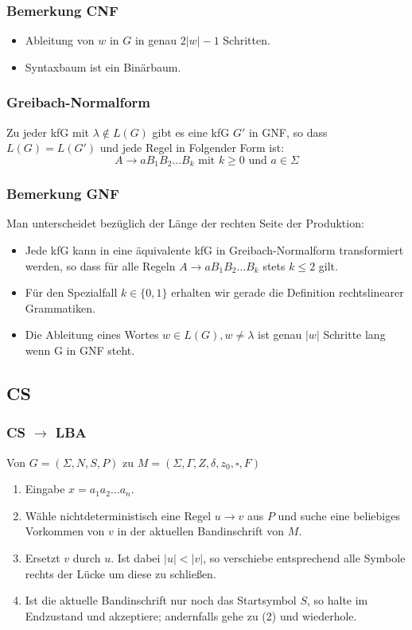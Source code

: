 \documentclass[9pt, a4paper]{article}
\begin{document}
\subsubsection{Bemerkung CNF}
\begin{itemize}
	\item Ableitung von $w$ in $G$ in genau $2|w|-1$ Schritten.
	\item Syntaxbaum ist ein Binärbaum.
\end{itemize}

\subsubsection{Greibach-Normalform}
Zu jeder kfG mit $\lambda \notin L(G)$ gibt es eine kfG $G'$ in GNF, so dass $L(G) = L(G')$ und jede Regel in Folgender Form ist:
$$A \to aB_1B_2 \dots B_k \text{ mit } k \geq 0 \text{ und } a \in \Sigma$$
\subsubsection{Bemerkung GNF}
Man unterscheidet bezüglich der Länge der rechten Seite der Produktion:
\begin{itemize}
	\item Jede kfG kann in eine äquivalente kfG in Greibach-Normalform transformiert werden, so dass für alle Regeln $A \to aB_1B_2 \dots B_k$ stets $k \leq 2$ gilt.
	\item Für den Spezialfall $k \in \{0, 1\}$ erhalten wir gerade die Definition rechtslinearer Grammatiken.
	\item Die Ableitung eines Wortes $w \in L(G), w \neq \lambda$ ist genau $|w|$ Schritte lang wenn G in GNF steht.
\end{itemize}

\subsection{CS}
\subsubsection{CS $\to$ LBA}
Von $G = (\Sigma, N, S, P)$ zu $M = (\Sigma, \Gamma, Z, \delta, z_0, \square, F)$
\begin{enumerate}
	\item Eingabe $x = a_1a_2 \dots a_n$.
	\item Wähle nichtdeterministisch eine Regel $u \to v$ aus $P$ und suche eine beliebiges Vorkommen von $v$ in der aktuellen Bandinschrift von $M$.
	\item Ersetzt $v$ durch $u$. Ist dabei $|u| < |v|$, so verschiebe entsprechend alle Symbole rechts der Lücke um diese zu schließen.
	\item Ist die aktuelle Bandinschrift nur noch das Startsymbol $S$, so halte im Endzustand und akzeptiere; andernfalls gehe zu (2) und wiederhole.
\end{enumerate}
\end{document}
